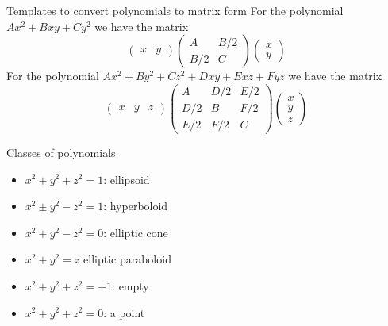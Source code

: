 \documentclass[journal, letterpaper]{IEEEtran}
\begin{document}
    \begin{mybox}{Templates to convert polynomials to matrix form}
        For the polynomial $Ax^2 + Bxy + Cy^2$ we have the matrix
        $$ \begin{pmatrix}
        x & y 
        \end{pmatrix}\begin{pmatrix}
            A & B/2 \\ 
            B/2 & C
        \end{pmatrix}\begin{pmatrix}
            x \\ y
        \end{pmatrix}$$
        For the polynomial $Ax^2 + By^2 + Cz^2 + Dxy + Exz + Fyz$ we have the matrix
        $$ \begin{pmatrix}
            x & y & z
        \end{pmatrix}\begin{pmatrix}
            A & D/2 & E/2 \\
            D/2 & B & F/2 \\
            E/2 & F/2 & C
        \end{pmatrix}\begin{pmatrix}
            x \\ y \\ z
        \end{pmatrix}$$
    \end{mybox}
    \begin{myboxr}{Classes of polynomials}
        \begin{itemize}
            \item $x^2 + y^2 + z^2 = 1$: ellipsoid
            \item $x^2 \pm y^2 - z^2 = 1$: hyperboloid
            \item $x^2 + y^2 - z^2 = 0$: elliptic cone
            \item $x^2 + y^2 = z$ elliptic paraboloid
            \item $x^2 + y^2 + z^2 = -1$: empty
            \item $x^2 + y^2 + z^2 = 0$: a point
        \end{itemize}
    \end{myboxr}
\end{document}
